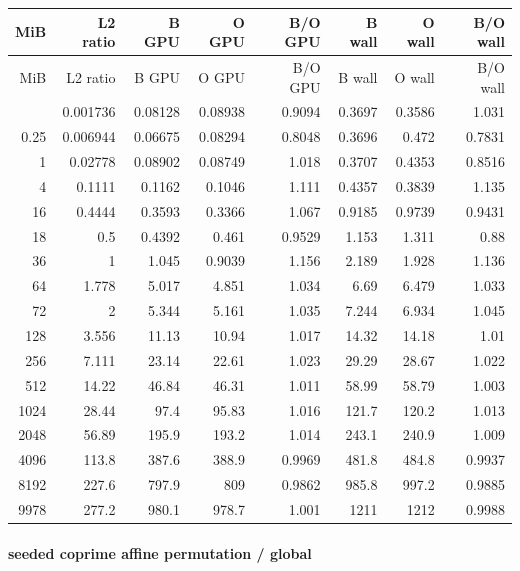 \begingroup
\scriptsize
\setlength{\tabcolsep}{2.5pt}
\renewcommand{\arraystretch}{1.16}
\begin{longtable}{rrrrrrrr}
\toprule
MiB & L2 ratio & B GPU & O GPU & B/O GPU & B wall & O wall & B/O wall \\
\midrule\endfirsthead
\toprule
MiB & L2 ratio & B GPU & O GPU & B/O GPU & B wall & O wall & B/O wall \\
\midrule\endhead
\bottomrule\endfoot
0.0625 & 0.001736 & 0.08128 & 0.08938 & 0.9094 & 0.3697 & 0.3586 & 1.031 \\
0.25 & 0.006944 & 0.06675 & 0.08294 & 0.8048 & 0.3696 & 0.472 & 0.7831 \\
1 & 0.02778 & 0.08902 & 0.08749 & 1.018 & 0.3707 & 0.4353 & 0.8516 \\
4 & 0.1111 & 0.1162 & 0.1046 & 1.111 & 0.4357 & 0.3839 & 1.135 \\
16 & 0.4444 & 0.3593 & 0.3366 & 1.067 & 0.9185 & 0.9739 & 0.9431 \\
18 & 0.5 & 0.4392 & 0.461 & 0.9529 & 1.153 & 1.311 & 0.88 \\
36 & 1 & 1.045 & 0.9039 & 1.156 & 2.189 & 1.928 & 1.136 \\
64 & 1.778 & 5.017 & 4.851 & 1.034 & 6.69 & 6.479 & 1.033 \\
72 & 2 & 5.344 & 5.161 & 1.035 & 7.244 & 6.934 & 1.045 \\
128 & 3.556 & 11.13 & 10.94 & 1.017 & 14.32 & 14.18 & 1.01 \\
256 & 7.111 & 23.14 & 22.61 & 1.023 & 29.29 & 28.67 & 1.022 \\
512 & 14.22 & 46.84 & 46.31 & 1.011 & 58.99 & 58.79 & 1.003 \\
1024 & 28.44 & 97.4 & 95.83 & 1.016 & 121.7 & 120.2 & 1.013 \\
2048 & 56.89 & 195.9 & 193.2 & 1.014 & 243.1 & 240.9 & 1.009 \\
4096 & 113.8 & 387.6 & 388.9 & 0.9969 & 481.8 & 484.8 & 0.9937 \\
8192 & 227.6 & 797.9 & 809 & 0.9862 & 985.8 & 997.2 & 0.9885 \\
9978 & 277.2 & 980.1 & 978.7 & 1.001 & 1211 & 1212 & 0.9988 \\
\end{longtable}
\endgroup


\paragraph{seeded coprime affine permutation / global}

